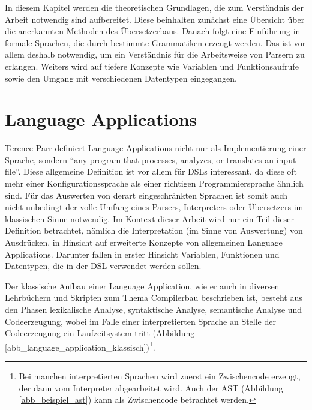 \label{chapter_theoretische_grundlagen}

In diesem Kapitel werden die theoretischen Grundlagen, die zum Verständnis der Arbeit not\-wen\-dig sind aufbereitet. Diese beinhalten zunächst eine Über\-sicht über die anerkannten Methoden des Übersetzerbaus. Danach folgt eine Ein\-füh\-rung in formale Sprachen, die durch bestimmte Grammatiken erzeugt werden. Das ist vor allem deshalb not\-wen\-dig, um ein Verständnis für die Arbeitsweise von Parsern zu erlangen. Weiters wird auf tiefere Konzepte wie Variablen und Funktionsaufrufe sowie den Umgang mit verschiedenen Datentypen eingegangen.


\section{Language Applications}
\label{theorie_language_applications}

Terence Parr definiert Language Applications nicht nur als Implementierung einer Sprache, sondern ``any program that processes, analyzes, or translates an input file''\cite{Parr10}. Diese allgemeine Definition ist vor allem für DSLs interessant, da diese oft mehr  einer Konfigurationssprache als einer richtigen Programmiersprache ähnlich sind. Für das Auswerten von derart ein\-ge\-schränk\-ten Sprachen ist somit auch nicht unbedingt der volle Umfang eines Parsers, Interpreters oder Übersetzers im klassischen Sinne not\-wen\-dig. Im Kontext dieser Arbeit wird nur ein Teil dieser Definition betrachtet, nämlich die Interpretation (im Sinne von Auswertung) von Ausdrücken, in Hinsicht auf erweiterte Konzepte von allgemeinen Language Applications. Darunter fallen in erster Hinsicht Variablen, Funktionen und Datentypen, die in der DSL verwendet werden sollen.

Der klassische Aufbau einer Language Application, wie er auch in diversen Lehrbüchern und Skripten zum Thema Compilerbau beschrieben ist, besteht aus den  Phasen lexikalische Analyse, syntaktische Analyse, semantische Analyse und Codeerzeugung, wobei im Falle einer interpretierten Sprache an Stelle der Codeerzeugung ein Laufzeitsystem tritt (Abbildung \ref{abb_language_application_klassisch})\footnote{Bei manchen interpretierten Sprachen wird zuerst ein Zwischencode erzeugt, der dann vom Interpreter abgearbeitet wird. Auch der AST (Abbildung \ref{abb_beispiel_ast}) kann als Zwischencode betrachtet werden.}.


